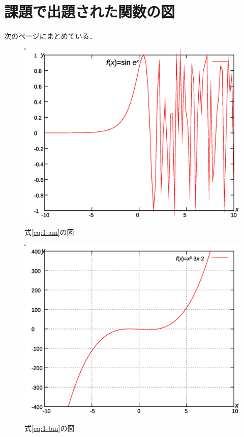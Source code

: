 \documentclass[12pt]{jarticle}
\renewcommand  \[  {\begin{eqnarray}}
\renewcommand  \]  {\end{eqnarray}}
\begin{document}
\section{課題で出題された関数の図}
次のページにまとめている．
\begin{figure}[p]
\begin{minipage}{7.95cm}
\center
\includegraphics[scale=0.35]{graph1.eps}
\caption{式\ref{eq:1-am}の図}
\label{fig:1-am}
\includegraphics[scale=0.35]{graph2.eps}
\caption{式\ref{eq:1-bm}の図}
\label{fig:1-bm}
\end{minipage}
\begin{minipage}{7.95cm}
\center

\end{minipage}
\end{figure}
\end{document}
